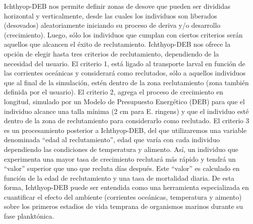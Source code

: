 Ichthyop-DEB nos permite definir zonas de desove que pueden ser divididas horizontal y verticalmente, desde las cuales los individuos son liberados (desovados) aleatoriamente iniciando su proceso de deriva y/o desarrollo (crecimiento). Luego, sólo los individuos que cumplan con ciertos criterios serán aquellos que alcancen el éxito de reclutamiento. Ichthyop-DEB nos ofrece la opción de elegir hasta tres criterios de reclutamiento, dependiendo de la necesidad del usuario. El criterio 1, está ligado al transporte larval en función de las corrientes oceánicas y considerará como reclutados, sólo a aquellos individuos que al final de la simulación, estén dentro de la zona reclutamiento (zona también definida por el usuario). El criterio 2, agrega el proceso de crecimiento en longitud, simulado por un Modelo de Presupuesto Energético (DEB) para que el individuo alcance una talla mínima (2 cm para E. ringens) y que el individuo esté dentro de la zona de reclutamiento para considerarlo como reclutado. El criterio 3 es un procesamiento posterior a Ichthyop-DEB, del que utilizaremos una variable denominada “edad al reclutamiento”, edad que varía con cada individuo dependiendo las condiciones de temperatura y alimento. Así, un individuo que experimenta una mayor tasa de crecimiento reclutará más rápido y tendrá un “valor” superior que uno que recluta días después. Este “valor” es calculado en función de la edad de reclutamiento y una tasa de mortalidad diaria. De esta forma, Ichthyop-DEB puede ser entendida como una herramienta especializada en cuantificar el efecto del ambiente (corrientes oceánicas, temperatura y aimento) sobre los primeros estadios de vida temprana de organismos marinos durante su fase planktónica.\\

